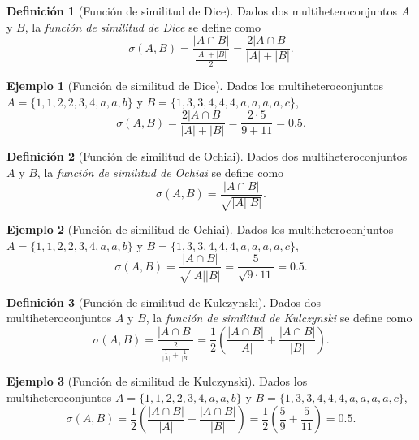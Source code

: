 \documentclass[a4paper,10pt,twoside]{article}
\theoremstyle{definition}
\newtheorem{definition}{Definición}
\newtheorem{example}{Ejemplo}
\begin{document}
\begin{definition}[Función de similitud de Dice]
Dados dos multiheteroconjuntos $A$ y $B$, la \emph{función de similitud de Dice} se define como
\[
\sigma(A,B) = \frac{|A\cap B|}{\frac{|A|+|B|}{2}} = \frac{2|A\cap B|}{|A|+|B|}.
\]
\end{definition}

\begin{example}[Función de similitud de Dice]
Dados los multiheteroconjuntos $A=\{1,1,2,2,3,4,\allowbreak a,a,b\}$ y $B=\{1,3,3,4,4,4,a,a,a,a,c\}$,
\[
\sigma(A,B) = \frac{2|A\cap B|}{|A|+|B|} = \frac{2\cdot 5}{9+11} = 0.5.
\]
\end{example}

\begin{definition}[Función de similitud de Ochiai]
Dados dos multiheteroconjuntos $A$ y $B$, la \emph{función de similitud de Ochiai} se define como
\[
\sigma(A,B) = \frac{|A\cap B|}{\sqrt{|A||B|}}.
\]
\end{definition}

\begin{example}[Función de similitud de Ochiai]
Dados los multiheteroconjuntos $A=\{1,1,2,2,3,4,\allowbreak a,a,b\}$ y $B=\{1,3,3,4,4,4,a,a,a,a,c\}$,
\[
\sigma(A,B) = \frac{|A\cap B|}{\sqrt{|A||B|}} = \frac{5}{\sqrt{9\cdot11}} = 0.5.
\]
\end{example}

\begin{definition}[Función de similitud de Kulczynski]
Dados dos multiheteroconjuntos $A$ y $B$, la \emph{función de similitud de Kulczynski} se define como
\[
\sigma(A,B) = \frac{|A\cap B|}{\frac{2}{\frac{1}{|A|}+\frac{1}{|B|}}} = \frac{1}{2}\left(\frac{|A\cap B|}{|A|}+\frac{|A\cap B|}{|B|} \right).
\]
\end{definition}

\begin{example}[Función de similitud de Kulczynski]
Dados los multiheteroconjuntos $A=\{1,1,2,\allowbreak 2,3,4,a,a,b\}$ y $B=\{1,3,3,4,4,4,a,a,a,a,c\}$,
\[
\sigma(A,B) = \frac{1}{2}\left(\frac{|A\cap B|}{|A|}+\frac{|A\cap B|}{|B|} \right) =
\frac{1}{2}\left(\frac{5}{9}+\frac{5}{11} \right) = 0.5.
\]
\end{example}
\end{document}
